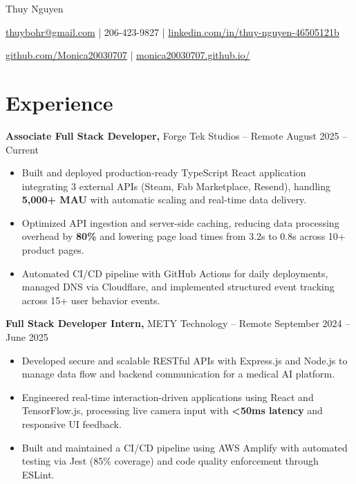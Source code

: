 \documentclass[11pt]{article}
\begin{document}
\centerline{\Huge Thuy Nguyen}

\vspace{5pt}

\centerline{\href{mailto:thuybohr@gmail.com}{thuybohr@gmail.com} | 206-423-9827 |
\href{https://www.linkedin.com/in/thuy-nguyen-46505121b/}{linkedin.com/in/thuy-nguyen-46505121b}}

\centerline{\href{https://github.com/Monica20030707}{github.com/Monica20030707} |
\href{https://monica20030707.github.io/}{monica20030707.github.io/}}

\vspace{-9pt}

\section*{Experience}

\textbf{Associate Full Stack Developer,} {Forge Tek Studios} -- Remote \hfill August 2025 -- Current
\vspace{-9pt}
\begin{itemize}
  \item Built and deployed production-ready TypeScript React application integrating 3 external APIs (Steam, Fab Marketplace, Resend), handling \textbf{5,000+ MAU} with automatic scaling and real-time data delivery.
  \item Optimized API ingestion and server-side caching, reducing data processing overhead by \textbf{80\%} and lowering page load times from 3.2s to 0.8s across 10+ product pages.
  \item Automated CI/CD pipeline with GitHub Actions for daily deployments, managed DNS via Cloudflare, and implemented structured event tracking across 15+ user behavior events.
\end{itemize}

\textbf{Full Stack Developer Intern,} {METY Technology} -- Remote \hfill September 2024 -- June 2025
\vspace{-9pt}
\begin{itemize}
  \item Developed secure and scalable RESTful APIs with Express.js and Node.js to manage data flow and backend communication for a medical AI platform.
  \item Engineered real-time interaction-driven applications using React and TensorFlow.js, processing live camera input with \textbf{<50ms latency} and responsive UI feedback.
  \item Built and maintained a CI/CD pipeline using AWS Amplify with automated testing via Jest (85\% coverage) and code quality enforcement through ESLint.
\end{itemize}
\end{document}
